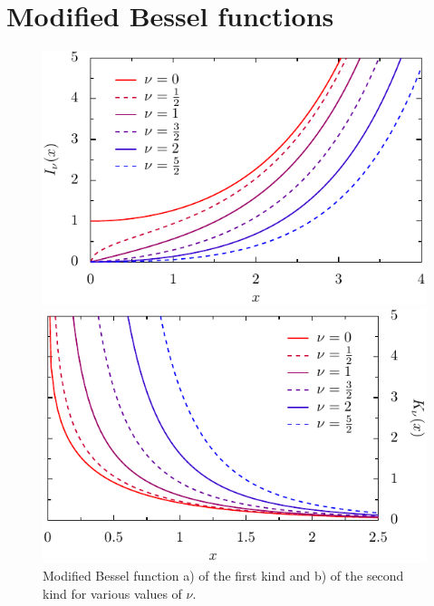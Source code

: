 \section{Modified Bessel functions}
\label{appendix_modified_bessel_functions}

\begin{figure}
    \begin{minipage}[b]{.5\linewidth}
    \centering
    \includegraphics[scale=0.8]{plots/iv.pdf}
    \end{minipage}%
    \begin{minipage}[b]{.5\linewidth}
    \centering
    \includegraphics[scale=0.8]{plots/kv.pdf}
    \end{minipage}

  \caption{Modified Bessel function a) of the first kind and b) of the second kind for various values of $\nu$.}
  \label{fig:appendix_ivkv}
\end{figure}

